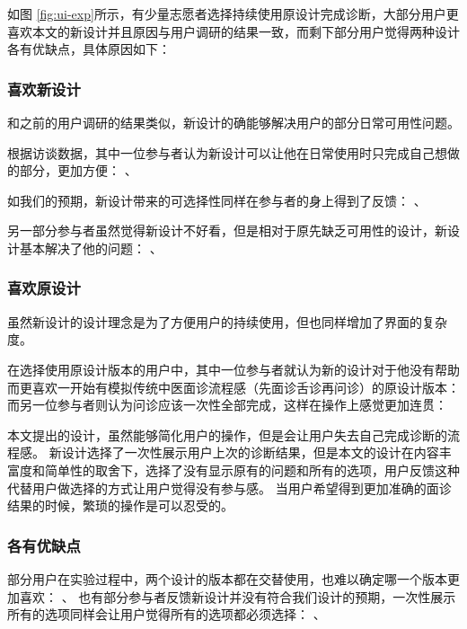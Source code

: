 如图 \ref{fig:ui-exp}所示，有少量志愿者选择持续使用原设计完成诊断，大部分用户更喜欢本文的新设计并且原因与用户调研的结果一致，而剩下部分用户觉得两种设计各有优缺点，具体原因如下：


\subsubsection{喜欢新设计}

和之前的用户调研的结果类似，新设计的确能够解决用户的部分日常可用性问题。

根据访谈数据，其中一位参与者认为新设计可以让他在日常使用时只完成自己想做的部分，更加方便：
、

如我们的预期，新设计带来的可选择性同样在参与者的身上得到了反馈：
、

另一部分参与者虽然觉得新设计不好看，但是相对于原先缺乏可用性的设计，新设计基本解决了他的问题：
、


\subsubsection{喜欢原设计}
虽然新设计的设计理念是为了方便用户的持续使用，但也同样增加了界面的复杂度。

在选择使用原设计版本的用户中，其中一位参与者就认为新的设计对于他没有帮助而更喜欢一开始有模拟传统中医面诊流程感（先面诊舌诊再问诊）的原设计版本：
而另一位参与者则认为问诊应该一次性全部完成，这样在操作上感觉更加连贯：

本文提出的设计，虽然能够简化用户的操作，但是会让用户失去自己完成诊断的流程感。
新设计选择了一次性展示用户上次的诊断结果，但是本文的设计在内容丰富度和简单性的取舍下，选择了没有显示原有的问题和所有的选项，用户反馈这种代替用户做选择的方式让用户觉得没有参与感。
当用户希望得到更加准确的面诊结果的时候，繁琐的操作是可以忍受的。

\subsubsection{各有优缺点}
部分用户在实验过程中，两个设计的版本都在交替使用，也难以确定哪一个版本更加喜欢：
、
也有部分参与者反馈新设计并没有符合我们设计的预期，一次性展示所有的选项同样会让用户觉得所有的选项都必须选择：
、


